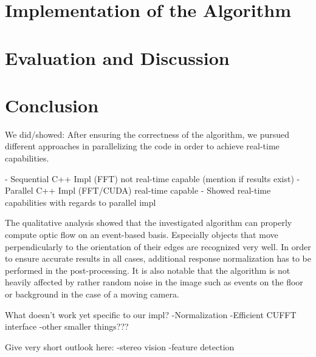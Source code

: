\documentclass[a4paper,twoside, openright,12pt]{report}
\begin{document}
\chapter{Implementation of the Algorithm}





\chapter{Evaluation and Discussion}





\chapter{Conclusion}

We did/showed:
After ensuring the correctness of the algorithm, we pursued different approaches in parallelizing the code in order to achieve real-time capabilities.

- Sequential C++ Impl (FFT) not real-time capable (mention if results exist)
- Parallel C++ Impl (FFT/CUDA) real-time capable
- Showed real-time capabilities with regards to parallel impl

The qualitative analysis showed that the investigated algorithm can properly compute optic flow on an event-based basis.
Especially objects that move perpendicularly to the orientation of their edges are recognized very well.
In order to ensure accurate results in all cases, additional response normalization has to be performed in the post-processing.
It is also notable that the algorithm is not heavily affected by rather random noise in the image such as events on the floor or background in the case of a moving camera.

What doesn't work yet specific to our impl? 
-Normalization
-Efficient CUFFT interface
-other smaller things???




Give very short outlook here:
-stereo vision
-feature detection




\cleardoublepage
{}
\listoffigures 	 %
\end{document}
